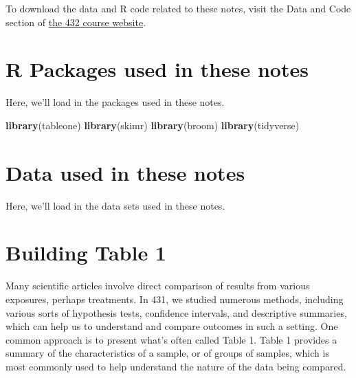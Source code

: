 \documentclass[]{book}
\newenvironment{Shaded}{\begin{snugshade}}{\end{snugshade}}
\newcommand{\KeywordTok}[1]{\textcolor[rgb]{0.13,0.29,0.53}{\textbf{#1}}}
\newcommand{\StringTok}[1]{\textcolor[rgb]{0.31,0.60,0.02}{#1}}
\newcommand{\OperatorTok}[1]{\textcolor[rgb]{0.81,0.36,0.00}{\textbf{#1}}}
\newcommand{\NormalTok}[1]{#1}
\theoremstyle{definition}
\theoremstyle{definition}
\theoremstyle{definition}
\theoremstyle{remark}
\begin{document}
To download the data and R code related to these notes, visit the Data
and Code section of \href{https://github.com/THOMASELOVE/432-2018}{the
432 course website}.

\chapter*{R Packages used in these
notes}\label{r-packages-used-in-these-notes}

Here, we'll load in the packages used in these notes.

\begin{Shaded}
\begin{Highlighting}[]
\KeywordTok{library}\NormalTok{(tableone)}
\KeywordTok{library}\NormalTok{(skimr)}
\KeywordTok{library}\NormalTok{(broom)}
\KeywordTok{library}\NormalTok{(tidyverse)}
\end{Highlighting}
\end{Shaded}

\chapter*{Data used in these notes}\label{data-used-in-these-notes}

Here, we'll load in the data sets used in these notes.

\begin{Shaded}
\end{Shaded}

\chapter{Building Table 1}\label{building-table-1}

Many scientific articles involve direct comparison of results from
various exposures, perhaps treatments. In 431, we studied numerous
methods, including various sorts of hypothesis tests, confidence
intervals, and descriptive summaries, which can help us to understand
and compare outcomes in such a setting. One common approach is to
present what's often called Table 1. Table 1 provides a summary of the
characteristics of a sample, or of groups of samples, which is most
commonly used to help understand the nature of the data being compared.
\end{document}
